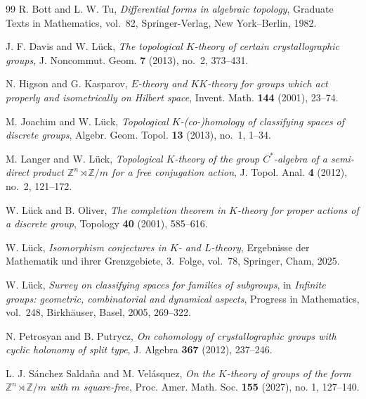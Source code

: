 \documentclass[11pt]{amsart}
\newcommand{\Z}{\mathbb Z}
\theoremstyle{remark}
\numberwithin{equation}{section}
\begin{document}
\begin{thebibliography}{99}
R. Bott and L. W. Tu,
\emph{Differential forms in algebraic topology},
Graduate Texts in Mathematics, vol.~82, Springer-Verlag,
New York--Berlin, 1982.

J. F. Davis and W. L\"uck,
\emph{The topological $K$-theory of certain crystallographic groups},
J. Noncommut. Geom. \textbf{7} (2013), no.~2,
373--431.

N. Higson and G. Kasparov,
\emph{$E$-theory and $KK$-theory for groups which act properly and
isometrically on Hilbert space},
Invent. Math. \textbf{144} (2001), 23--74.

M. Joachim and W. L\"uck,
\emph{Topological $K$-(co-)homology of classifying spaces of discrete groups},
Algebr. Geom. Topol. \textbf{13} (2013), no.~1, 1--34.

M. Langer and W. L\"uck,
\emph{Topological $K$-theory of the group $C^*$-algebra of a
semi-direct product $\Z^n\rtimes\Z/m$ for a free conjugation action},
J. Topol. Anal. \textbf{4} (2012), no.~2, 121--172.

W. L\"uck and B. Oliver,
\emph{The completion theorem in $K$-theory for proper actions of a discrete group},
Topology \textbf{40} (2001), 585--616.

W. L\"uck,
\emph{Isomorphism conjectures in $K$- and $L$-theory},
Ergebnisse der Mathematik und ihrer Grenzgebiete, 3.~Folge,
vol.~78, Springer, Cham, 2025.

W. L\"uck,
\emph{Survey on classifying spaces for families of subgroups},
in \emph{Infinite groups: geometric, combinatorial and dynamical
aspects}, Progress in Mathematics, vol.~248, Birkh\"auser, Basel,
2005, 269--322.

N. Petrosyan and B. Putrycz,
\emph{On cohomology of crystallographic groups with cyclic holonomy of split type},
J. Algebra \textbf{367} (2012), 237--246.

L. J. S\'anchez Salda\~na and M. Vel\'asquez,
\emph{On the $K$-theory of groups of the form
$\Z^n\rtimes\Z/m$ with $m$ square-free},
Proc. Amer. Math. Soc. \textbf{155} (2027), no. 1, 127--140.
\end{thebibliography}
\end{document}
